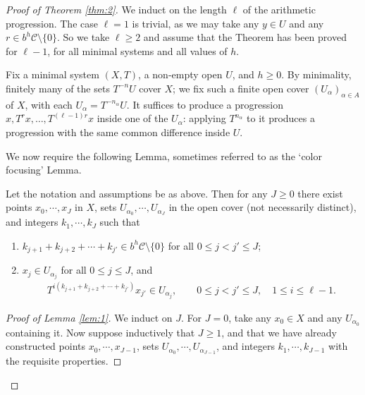 \begin{proof}[Proof of Theorem \ref{thm:2}] We induct on the length $\ell$ of the arithmetic progression.  The case $\ell=1$ is trivial, as we may take any $y \in U$ and any $r \in b ^{h}\mathcal C \setminus \{0\}$.  So we take $\ell\geq 2$ and assume that the Theorem has been proved for $\ell-1$, for all minimal systems and all values of $h$.

Fix a minimal system $(X,T)$, a non-empty open $U$, and $h \geq 0$.  By minimality, finitely many of the sets $T ^{-n}U$ cover $X$; 
we fix such a finite open cover $(U_\alpha)_{\alpha \in A}$ of $X$, with each $U_\alpha = T ^{-n_\alpha}U$.  
It suffices to produce a progression $x, T ^{r}x, \ldots, T ^{(\ell-1)r}x$ inside one of the $U_\alpha$: applying $T ^{n_\alpha}$ to it 
produces a progression with the same common difference inside $U$.  

We now require the following Lemma, sometimes referred to as the `color focusing' Lemma. 

\begin{lemma}\label{lem:1}
   Let the notation and assumptions be as above. Then for any $J\geq 0$ there exist points $x_0,\cdots ,x_J$ in $X$, sets $U_{\alpha_0},\cdots ,U_{\alpha_J}$ in the open cover (not necessarily distinct), and integers $k_1,\cdots ,k_{J}$ such that
   \begin{enumerate}
       \item[(1)] $k_{j+1}+k_{j+2}+\cdots +k_{j'}\in b^{h}\mathcal C\setminus \{0\}$ for all $0\leq j< j'\leq J$;  
       \item[(2)]  $x_{j}\in U_{\alpha_j}$ for all $0\leq j \leq J$, and 
       \begin{align*}
T^{i(k_{j+1}+k_{j+2}+\cdots +k_{j'})}x_{j'}\in U_{\alpha_j}, \qquad 0\leq j<j'\leq J, \quad 1\leq i\leq \ell-1 . 
    \end{align*} 
   \end{enumerate}
\end{lemma}

\begin{proof}[Proof of Lemma \ref{lem:1}] We induct on $J$. For $J=0$, take any $x_0 \in X$ and any $U_{\alpha_0}$ containing it. Now suppose inductively that $J\geq 1$, and that we have already constructed points $x_0,\cdots ,x_{J-1}$, sets  $U_{\alpha_0},\cdots ,U_{\alpha_{J-1}}$, and integers $k_1,\cdots ,k_{J-1}$ with the requisite properties. 


\end{proof}
\end{proof}
